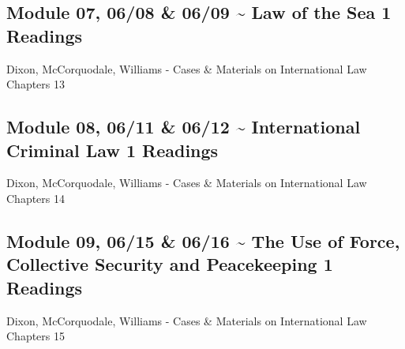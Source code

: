 \documentclass[10pt,]{article}
\begin{document}
\hypertarget{module-07-0608-0609-law-of-the-sea-1-readings}{%
\subsection{Module 07, 06/08 \& 06/09 \textasciitilde{} Law of the Sea
\textbar{} 1
Readings}\label{module-07-0608-0609-law-of-the-sea-1-readings}}

Dixon, McCorquodale, Williams - Cases \& Materials on International Law
Chapters 13

\hypertarget{module-08-0611-0612-international-criminal-law-1-readings}{%
\subsection{Module 08, 06/11 \& 06/12 \textasciitilde{} International
Criminal Law \textbar{} 1
Readings}\label{module-08-0611-0612-international-criminal-law-1-readings}}

Dixon, McCorquodale, Williams - Cases \& Materials on International Law
Chapters 14

\hypertarget{module-09-0615-0616-the-use-of-force-collective-security-and-peacekeeping-1-readings}{%
\subsection{Module 09, 06/15 \& 06/16 \textasciitilde{} The Use of
Force, Collective Security and Peacekeeping \textbar{} 1
Readings}\label{module-09-0615-0616-the-use-of-force-collective-security-and-peacekeeping-1-readings}}

Dixon, McCorquodale, Williams - Cases \& Materials on International Law
Chapters 15
\end{document}
